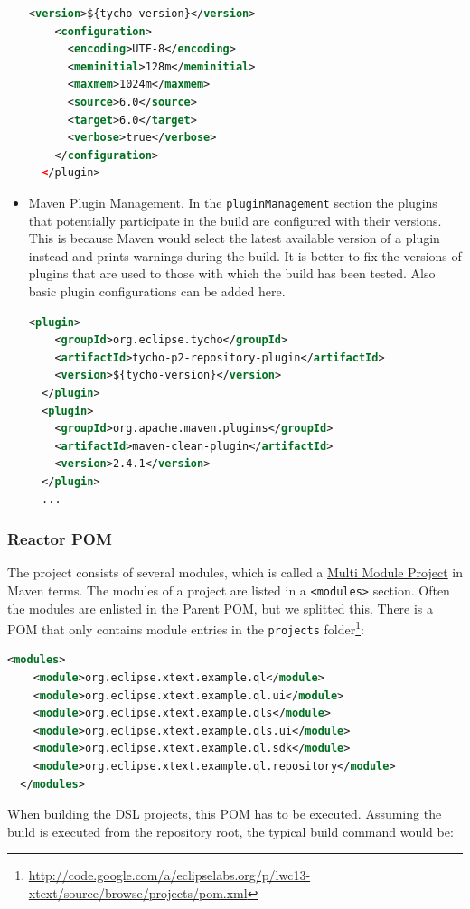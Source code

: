 \begin{itemize}
\begin{lstlisting}[language=XML]
    <version>${tycho-version}</version>
    <configuration>
      <encoding>UTF-8</encoding>
      <meminitial>128m</meminitial>
      <maxmem>1024m</maxmem>
      <source>6.0</source>
      <target>6.0</target>
      <verbose>true</verbose>
    </configuration>
  </plugin>
\end{lstlisting}
\item Maven Plugin Management. In the \texttt{pluginManagement} section the plugins that
potentially participate in the build are configured with their versions. This is
because Maven would select the latest available version of a plugin instead and
prints warnings during the build. It is better to fix the versions of plugins
that are used to those with which the build has been tested. Also basic plugin
configurations can be added here.
\begin{lstlisting}[language=XML]
  <plugin>
    <groupId>org.eclipse.tycho</groupId>
    <artifactId>tycho-p2-repository-plugin</artifactId>
    <version>${tycho-version}</version>
  </plugin>
  <plugin>
    <groupId>org.apache.maven.plugins</groupId>
    <artifactId>maven-clean-plugin</artifactId>
    <version>2.4.1</version>
  </plugin>
  ...
\end{lstlisting}
\end{itemize}

\subsubsection{Reactor POM}
The project consists of several modules, which is called a
\href{http://www.sonatype.com/books/mvnex-book/reference/multimodule.html}{Multi
Module Project} in Maven terms. The modules of a project are listed in a
\texttt{<modules>} section. Often the modules are enlisted in the Parent POM,
but we splitted this. There is a POM that only contains module entries in the
\texttt{projects}
folder\footnote{\url{http://code.google.com/a/eclipselabs.org/p/lwc13-xtext/source/browse/projects/pom.xml}}:

\begin{lstlisting}[language=XML]
  <modules>
    <module>org.eclipse.xtext.example.ql</module>
    <module>org.eclipse.xtext.example.ql.ui</module>
    <module>org.eclipse.xtext.example.qls</module>
    <module>org.eclipse.xtext.example.qls.ui</module>
    <module>org.eclipse.xtext.example.ql.sdk</module>
    <module>org.eclipse.xtext.example.ql.repository</module>
  </modules>
\end{lstlisting}

When building the DSL projects, this POM has to be executed. Assuming the build
is executed from the repository root, the typical build command would be:

